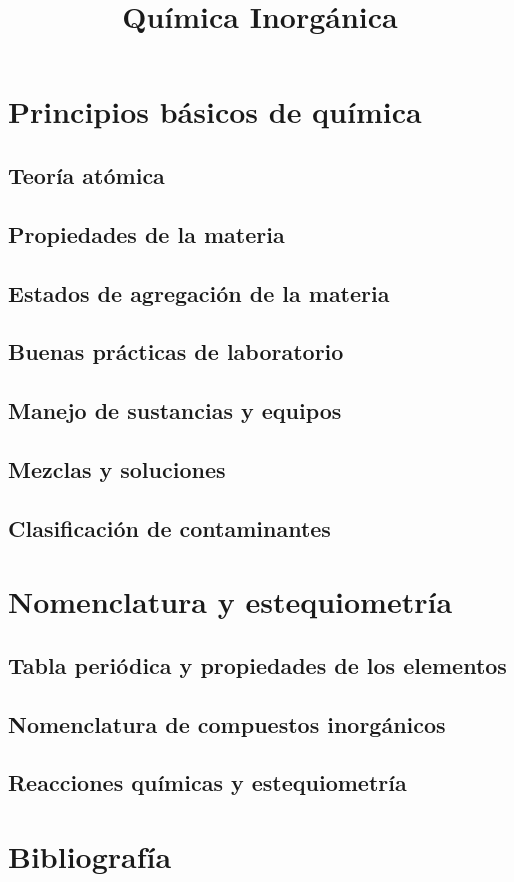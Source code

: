 \documentclass{{../slide}}
\title{Química Inorgánica}
\institute{Universidad Politécnica de Sinaloa}
\begin{document}
\Portada
\Indice


    \section{Principios básicos de química}

\subsection{Teoría atómica}
\subsection{Propiedades de la materia}
\subsection{Estados de agregación de la materia}
\subsection{Buenas prácticas de laboratorio}
\subsection{Manejo de sustancias y equipos}
\subsection{Mezclas y soluciones}
\subsection{Clasificación de contaminantes}


    \section{Nomenclatura y estequiometría}

\subsection{Tabla periódica y propiedades de los elementos}
\subsection{Nomenclatura de compuestos inorgánicos}
\subsection{Reacciones químicas y estequiometría}


\section{Bibliografía}

\begin{frame}
    
\end{frame}
\end{document}
